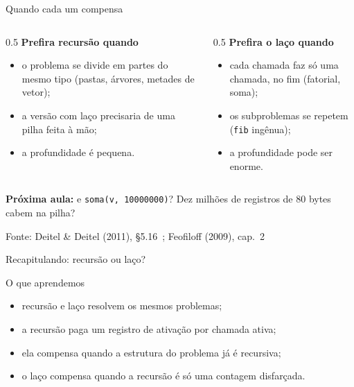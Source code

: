 \documentclass[aspectratio=169]{beamer}
\newcommand{\fonte}[1]{\vfill\hfill{\scriptsize\textcolor{UFSGray}{Fonte: #1}}}
\begin{document}
\begin{frame}{Quando cada um compensa}
  \begin{columns}[T]
    \begin{column}{0.5\textwidth}
      \textcolor{UFSBlue}{\textbf{Prefira recursão quando}}
      \begin{itemize}
        \small
        \item o problema se divide em partes do mesmo tipo (pastas,
          árvores, metades de vetor);
        \item a versão com laço precisaria de uma pilha feita à mão;
        \item a profundidade é pequena.
      \end{itemize}
    \end{column}
    \begin{column}{0.5\textwidth}
      \textcolor{UFSRed}{\textbf{Prefira o laço quando}}
      \begin{itemize}
        \small
        \item cada chamada faz só uma chamada, no fim (fatorial, soma);
        \item os subproblemas se repetem (\texttt{fib} ingênua);
        \item a profundidade pode ser enorme.
      \end{itemize}
    \end{column}
  \end{columns}
  \medskip
  \begin{center}
    \small\textcolor{UFSRed}{\textbf{Próxima aula:}} e \texttt{soma(v, 10000000)}?
    Dez milhões de registros de 80 bytes cabem na pilha?
  \end{center}
  \fonte{Deitel \& Deitel (2011), §5.16~\cite{deitel2011como};
    Feofiloff (2009), cap.~2~\cite{feofiloff2009algoritmos}}
\end{frame}

\begin{frame}{Recapitulando: recursão ou laço?}
  \begin{block}{O que aprendemos}
    \begin{itemize}
      \item recursão e laço resolvem os mesmos problemas;
      \item a recursão paga um registro de ativação por chamada ativa;
      \item ela compensa quando a estrutura do problema já é recursiva;
      \item o laço compensa quando a recursão é só uma contagem disfarçada.
    \end{itemize}
  \end{block}
\end{frame}
\end{document}
